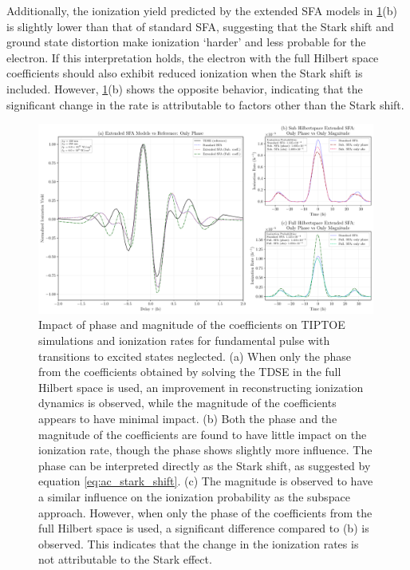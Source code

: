 \medskip
Additionally, the ionization yield predicted by the extended SFA models in \ref{fig:tiptoe_rate_stark}(b) is slightly lower than that of standard SFA, suggesting that the Stark shift and ground state distortion make ionization ‘harder’ and less probable for the electron.
If this interpretation holds, the electron with the full Hilbert space coefficients should also exhibit reduced ionization when the Stark shift is included.
However, \ref{fig:tiptoe_rate_stark}(b) shows the opposite behavior, indicating that the significant change in the rate is attributable to factors other than the Stark shift.


\begin{figure}[htbp]
    \centering
    \includegraphics[width=0.99\textwidth]{figures/3plot_stark-comparison_1_BA.pdf}
    \caption[Impact of phase and magnitude of the coefficients on TIPTOE simulations and ionization rates]{Impact of phase and magnitude of the coefficients on TIPTOE simulations and ionization rates for fundamental pulse with transitions to excited states neglected. (a) When only the phase from the coefficients obtained by solving the TDSE in the full Hilbert space is used, an improvement in reconstructing ionization dynamics is observed, while the magnitude of the coefficients appears to have minimal impact. (b) Both the phase and the magnitude of the coefficients are found to have little impact on the ionization rate, though the phase shows slightly more influence. The phase can be interpreted directly as the Stark shift, as suggested by equation \eqref{eq:ac_stark_shift}. (c) The magnitude is observed to have a similar influence on the ionization probability as the subspace approach. However, when only the phase of the coefficients from the full Hilbert space is used, a significant difference compared to (b) is observed. This indicates that the change in the ionization rates is not attributable to the Stark effect.}
    \label{fig:tiptoe_rate_stark}
\end{figure}


